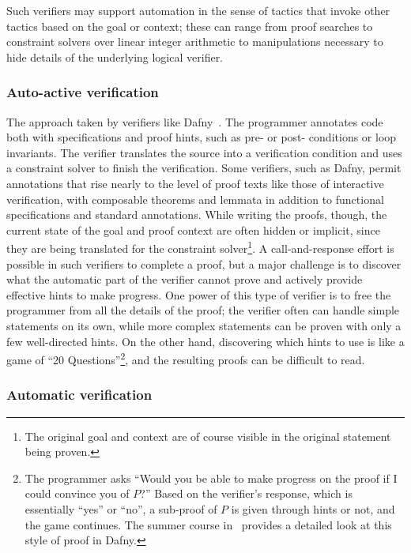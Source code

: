 Such verifiers may support automation in the sense of tactics that invoke other
tactics based on the goal or context; these can range from proof searches to
constraint solvers over linear integer arithmetic to manipulations necessary to
hide details of the underlying logical verifier.

\subsubsection{Auto-active verification}

The approach taken by verifiers like Dafny~\cite{leino2010dafny}. The programmer
annotates code both with specifications and proof hints, such as pre- or post-
conditions or loop invariants. The verifier translates the source into a
verification condition and uses a constraint solver to finish the verification.
Some verifiers, such as Dafny, permit annotations that rise nearly to the level of
proof texts like those of interactive verification, with composable theorems and
lemmata in addition to functional specifications and standard annotations. While
writing the proofs, though, the current state of the  goal and proof context are
often hidden or implicit, since they are being translated for the constraint
solver\footnote{The original goal and context are of course visible in the
original statement being proven.}. A call-and-response effort is possible in
such verifiers to complete a proof, but a major challenge is to discover what the
automatic part of the verifier cannot prove and actively provide effective hints
to make progress. One power of this type of verifier is to free the programmer
from all the details of the proof; the verifier often can handle simple
statements on its own, while more complex statements can be proven with only a
few well-directed hints. On the other hand, discovering which hints to use is
like a game of ``20 Questions''\footnote{The programmer asks ``Would you be able
to make progress on the proof if I could convince you of \(P\)?'' Based on the
verifier's response, which is essentially ``yes'' or ``no'', a sub-proof of
\(P\) is given through hints or not, and the game continues. The summer course
in~\cite{Kapritsos_2020} provides a detailed look at this style of proof in
Dafny.}, and the resulting proofs can be difficult to read.

\subsubsection{Automatic verification}


